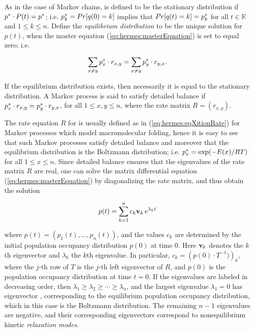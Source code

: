 As in the case of Markov chains,
\statDist is defined to be
the stationary distribution if
$p^* \cdot P(t)= p^*$; i.e. $p^*_k = Pr[ q(0) = k ]$ implies that
$Pr[ q(t) = k] = p^*_k$ for all $t \in \mathbb{R}$ and
$1 \leq k \leq n$.
Define the {\em equilibrium distribution} \statDist
to be the unique solution for $p(t)$, when the master equation
(\ref{eq:hermes:masterEquation}) is set to equal zero; i.e.

\begin{align}
\label{eq:hermes:equilibriumTime}
\sum_{x \ne y} \pSt_x \cdot r_{x,y} = \sum_{x \ne y} \pSt_y \cdot r_{y,x}.
\end{align}

If the equilibrium distribution exists, then necessarily it is equal to
the stationary distribution. A Markov process is said
to satisfy detailed balance if $p^*_x \cdot r_{x,y} = p^*_y \cdot r_{y,x}$,
for all $1 \leq x,y \leq n$, where the rate matrix $R = (r_{x,y})$.

The rate equation $R$ for is usually defined
as in (\ref{eq:hermes:eqXitionRate}) for
Markov processes which model macromolecular folding,
hence it is easy to see that
such Markov processes satisfy detailed balance and moreover that
the equilibrium distribution is the
Boltzmann distribution; i.e.  $p^*_x = \exp(-E(x)/RT)$ for
all $1 \leq x \leq n$.
Since detailed balance ensures that the eigenvalues of the rate matrix $R$ are
real, one can solve the matrix differential equation
(\ref{eq:hermes:masterEquation}) by diagonalizing the rate matrix, and thus obtain
the solution

\begin{align}
\label{eq:hermes:populationOccupancyEquation}
p(t) = \sum_{k=1}^n c_k {\bf v}_k\, e^{\lambda_k t}
\end{align}

where $p(t) = (p_1(t),\dots,p_n(t))$, and the
values $c_k$ are determined by the initial population occupancy
distribution $p(0)$ at time 0. Here
${\bf v}_k$ denotes the $k$th eigenvector and
$\lambda_k$ the $k$th eigenvalue. In particular,
$c_k = \left(p(0) \cdot T^{-1})\right)_k$, where the $j$-th row of $T$
is the $j$-th left eigenvector of $R$,
and $p(0)$ is the population occupancy distribution
at time $t=0$. If the eigenvalues are labeled in decreasing
order, then $\lambda_1 \geq \lambda_2 \geq \cdots \geq \lambda_n$,
and the largest eigenvalue $\lambda_1=0$ has eigenvector \pSt, corresponding
to the equilibrium population occupancy distribution, which in this case
is the Boltzmann distribution. The
remaining $n-1$ eigenvalues are negative, and their corresponding eigenvectors
correspond to nonequilibrium kinetic {\em relaxation modes}.

